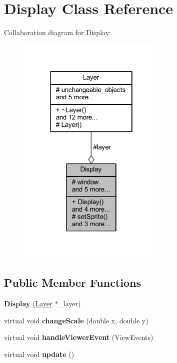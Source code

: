 \hypertarget{class_display}{}\section{Display Class Reference}
\label{class_display}


Collaboration diagram for Display\+:\nopagebreak
\begin{figure}[H]
\begin{center}
\leavevmode
\includegraphics[width=202pt]{class_display__coll__graph}
\end{center}
\end{figure}
\subsection*{Public Member Functions}
\begin{DoxyCompactItemize}
\item 
\mbox{\label{class_display_a26d0e334f62107584f42e8fa3608f546}} 
{\bfseries Display} (\hyperlink{class_layer}{Layer} $\ast$\+\_\+layer)
\item 
\mbox{\label{class_display_a23741d950a417ff7f3a24ba0ee9582cb}} 
virtual void {\bfseries change\+Scale} (double x, double y)
\item 
\mbox{\label{class_display_ad46fa6155c4ffe40f11ebf2daee6d67c}} 
virtual void {\bfseries handle\+Viewer\+Event} (View\+Events)
\item 
\mbox{\label{class_display_ad2740b779d61e461c4dcaaf34f1fcd8f}} 
virtual void {\bfseries update} ()
\end{DoxyCompactItemize}
